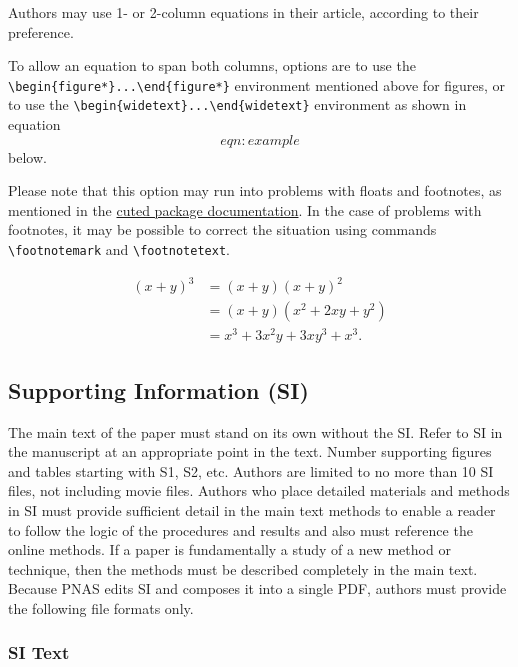 \documentclass[9pt,twocolumn,twoside,]{pnas-new}
\begin{document}
Authors may use 1- or 2-column equations in their article, according to
their preference.

To allow an equation to span both columns, options are to use the
\texttt{\textbackslash{}begin\{figure*\}...\textbackslash{}end\{figure*\}}
environment mentioned above for figures, or to use the
\texttt{\textbackslash{}begin\{widetext\}...\textbackslash{}end\{widetext\}}
environment as shown in equation \[eqn:example\] below.

Please note that this option may run into problems with floats and
footnotes, as mentioned in the \href{http://texdoc.net/pkg/cuted}{cuted
package documentation}. In the case of problems with footnotes, it may
be possible to correct the situation using commands
\texttt{\textbackslash{}footnotemark} and
\texttt{\textbackslash{}footnotetext}.

\[\begin{aligned}
(x+y)^3&=(x+y)(x+y)^2\\
       &=(x+y)(x^2+2xy+y^2) \label{eqn:example} \\
       &=x^3+3x^2y+3xy^3+x^3. 
\end{aligned}\]

\subsection*{Supporting Information
(SI)}\label{supporting-information-si}

The main text of the paper must stand on its own without the SI. Refer
to SI in the manuscript at an appropriate point in the text. Number
supporting figures and tables starting with S1, S2, etc. Authors are
limited to no more than 10 SI files, not including movie files. Authors
who place detailed materials and methods in SI must provide sufficient
detail in the main text methods to enable a reader to follow the logic
of the procedures and results and also must reference the online
methods. If a paper is fundamentally a study of a new method or
technique, then the methods must be described completely in the main
text. Because PNAS edits SI and composes it into a single PDF, authors
must provide the following file formats only.

\subsubsection*{SI Text}\label{si-text}
\end{document}
